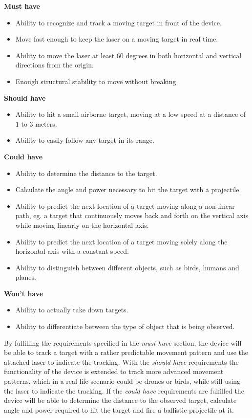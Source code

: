 \textbf{Must have}
\begin{itemize}
	\item Ability to recognize and track a moving target in front of the device.
	\item Move fast enough to keep the laser on a moving target in real time.
	\item Ability to move the laser at least 60 degrees in both horizontal and vertical directions from the origin.
	\item Enough structural stability to move without breaking.
\end{itemize}

\textbf{Should have}
\begin{itemize}
	\item Ability to hit a small airborne target, moving at a low speed at a distance of 1 to 3 meters.
	\item Ability to easily follow any target in its range.
	
\end{itemize}

\textbf{Could have}
\begin{itemize}
	\item Ability to determine the distance to the target.
	\item Calculate the angle and power necessary to hit the target with a projectile.
	\item Ability to predict the next location of a target moving along a non-linear path, eg{.} a target that continuously moves back and forth on the vertical axis while moving linearly on the horizontal axis.
	\item Ability to predict the next location of a target moving solely along the horizontal axis with a constant speed.
	\item Ability to distinguish between different objects, such as birds, humans and planes.
\end{itemize}

\textbf{Won't have}
\begin{itemize}
	\item Ability to actually take down targets.
	\item Ability to differentiate between the type of object that is being observed.
\end{itemize}

By fulfilling the requirements specified in the \textit{must have} section, the device will be able to track a target with a rather predictable movement pattern and use the attached laser to indicate the tracking.
With the \textit{should have} requirements the functionality of the device is extended to track more advanced movement patterns, which in a real life scenario could be drones or birds, while still using the laser to indicate the tracking.
If the \textit{could have} requirements are fulfilled the device will be able to determine the distance to the observed target, calculate angle and power required to hit the target and fire a ballistic projectile at it.

